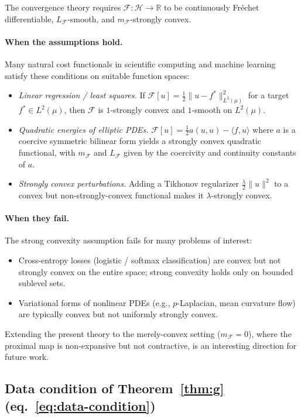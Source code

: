 \documentclass[twoside,11pt]{article}
\newcommand{\R}{\mathbb{R}}
\newcommand{\calF}{\mathcal{F}}
\newcommand{\calH}{\mathcal{H}}
\begin{document}
The convergence theory requires $\calF:\calH\to\R$ to be continuously Fr\'echet differentiable,
$L_\calF$-smooth, and $m_\calF$-strongly convex.

\paragraph{When the assumptions hold.}
Many natural cost functionals in scientific computing and machine learning satisfy these
conditions on suitable function spaces:
\begin{itemize}
\item \emph{Linear regression / least squares.} If
$\calF[u]=\frac12\|u-f^*\|^2_{L^2(\mu)}$ for a target $f^*\in L^2(\mu)$, then $\calF$ is
$1$-strongly convex and $1$-smooth on $L^2(\mu)$.
\item \emph{Quadratic energies of elliptic PDEs.}
$\calF[u]=\frac12 a(u,u)-\langle f,u\rangle$ where $a$ is a coercive symmetric bilinear form
yields a strongly convex quadratic functional, with $m_\calF$ and $L_\calF$ given by the
coercivity and continuity constants of $a$.
\item \emph{Strongly convex perturbations.} Adding a Tikhonov regularizer $\frac{\lambda}{2}\|u\|^2$
to a convex but non-strongly-convex functional makes it $\lambda$-strongly convex.
\end{itemize}

\paragraph{When they fail.}
The strong convexity assumption fails for many problems of interest:
\begin{itemize}
\item Cross-entropy losses (logistic / softmax classification) are convex but not strongly
convex on the entire space; strong convexity holds only on bounded sublevel sets.
\item Variational forms of nonlinear PDEs (e.g., $p$-Laplacian, mean curvature flow) are
typically convex but not uniformly strongly convex.
\end{itemize}
Extending the present theory to the merely-convex setting ($m_\calF=0$), where the proximal map is non-expansive but not contractive, is an interesting direction for future work.

\subsection{Data condition of Theorem~\ref{thm:g} (eq.~\eqref{eq:data-condition})}\label{app:disc-data-condition}
\end{document}
